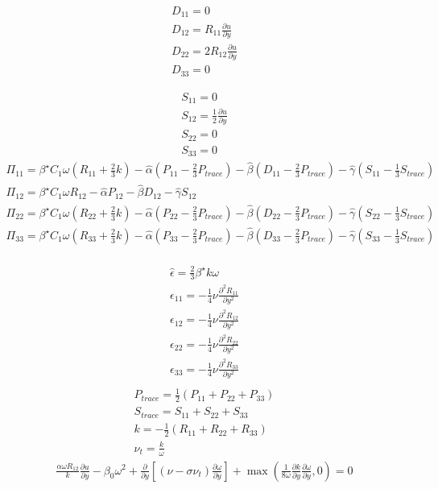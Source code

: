 \documentclass[%
notitlepage,
]{revtex4-1}
\newcommand{\pd}[2]{\frac{\partial #1}{\partial #2}}
\begin{document}
\begin{eqnarray}
  D_{11} = 0\\
  D_{12} = R_{11}\pd{u}{y}\\ 
  D_{22} = 2 R_{12}\pd{u}{y}\\ 
  D_{33} = 0
\end{eqnarray}

\begin{eqnarray}
  S_{11} = 0\\
  S_{12} = \frac{1}{2}\pd{u}{y}\\
  S_{22} = 0\\
  S_{33} = 0
\end{eqnarray}
\begin{eqnarray}
  \Pi_{11} = \beta^{\star}C_1\omega\left(R_{11} + \frac{2}{3}k\right) - \hat{\alpha}\left(P_{11} - \frac{2}{3}P_{trace}\right) - \hat{\beta}\left(D_{11} - \frac{2}{3}P_{trace}\right) - \hat{\gamma}\left(S_{11} - \frac{1}{3}S_{trace}\right)\\
  \Pi_{12} = \beta^{\star}C_1\omega R_{12} - \hat{\alpha} P_{12} - \hat{\beta} D_{12}- \hat{\gamma} S_{12}\\
  \Pi_{22} = \beta^{\star}C_1\omega\left(R_{22} + \frac{2}{3}k\right) - \hat{\alpha}\left(P_{22} - \frac{2}{3}P_{trace}\right) - \hat{\beta}\left(D_{22} - \frac{2}{3}P_{trace}\right) - \hat{\gamma}\left(S_{22} - \frac{1}{3}S_{trace}\right)\\
  \Pi_{33} = \beta^{\star}C_1\omega\left(R_{33} + \frac{2}{3}k\right) - \hat{\alpha}\left(P_{33} - \frac{2}{3}P_{trace}\right) - \hat{\beta}\left(D_{33} - \frac{2}{3}P_{trace}\right) - \hat{\gamma}\left(S_{33} - \frac{1}{3}S_{trace}\right)\\
\end{eqnarray}


\begin{eqnarray}
  \hat{\epsilon} = \frac{2}{3}\beta^{\star}k \omega\\
  \epsilon_{11} = -\frac{1}{4}\nu \pd{^{2}R_{11}}{y^2}\\ 
  \epsilon_{12} = -\frac{1}{4}\nu \pd{^{2}R_{12}}{y^2}\\ 
  \epsilon_{22} = -\frac{1}{4}\nu \pd{^{2}R_{22}}{y^2}\\ 
  \epsilon_{33} = -\frac{1}{4}\nu \pd{^{2}R_{33}}{y^2}\\ 
\end{eqnarray}
\begin{eqnarray}
  P_{trace} = \frac{1}{2}(P_{11} + P_{22} + P_{33})\\
  S_{trace} = S_{11} + S_{22} + S_{33}\\
  k = -\frac{1}{2}\left(R_{11} + R_{22} + R_{33}\right)\\
  \nu_t = \frac{k}{\omega}
\end{eqnarray}
\begin{eqnarray}
\frac{\alpha \omega R_{12}}{k}\pd{u}{y} - \beta_{0}\omega^2 +\pd{}{y}\left[\left(\nu - \sigma\nu_t\right)\pd{\omega}{y}\right] + \max\left(\frac{1}{8\omega}\pd{k}{y}\pd{\omega}{y}, 0\right) = 0 \\
\end{eqnarray}
\end{document}
